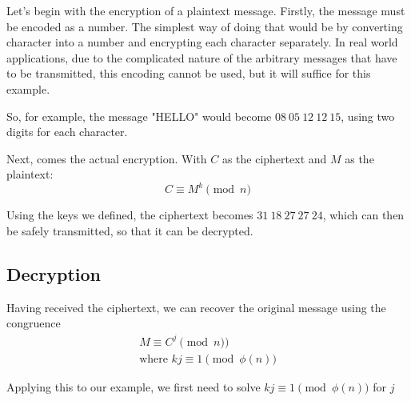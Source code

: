 \documentclass[12pt, titlepage]{article}
\begin{document}
    Let's begin with the encryption of a plaintext message. Firstly, the message must be
    encoded as a number. The simplest way of doing that would be by converting character
    into a number and encrypting each character separately.  In real world applications, due
    to the complicated nature of the arbitrary messages that have to be transmitted, this
    encoding cannot be used, but it will suffice for this example.

    So, for example, the message "HELLO" would become $08\ 05\ 12\ 12\ 15$, using two digits
    for each character.

    Next, comes the actual encryption. With $C$ as the ciphertext and $M$ as the plaintext:
    \begin{equation*}
        C \equiv M^{k} \pmod{n}
    \end{equation*}

    Using the keys we defined, the ciphertext becomes $31\ 18\ 27\ 27\ 24$, which can then
    be safely transmitted, so that it can be decrypted.

    \subsection{Decryption}
    Having received the ciphertext, we can recover the original message using the congruence
    \begin{align*}
        M \equiv C^j \pmod{n})\\
        \text{where } kj \equiv 1 \pmod{\phi (n)}
    \end{align*}

    Applying this to our example, we first need to solve $ kj \equiv 1 \pmod{\phi (n)}$ for
    $j$
\end{document}
